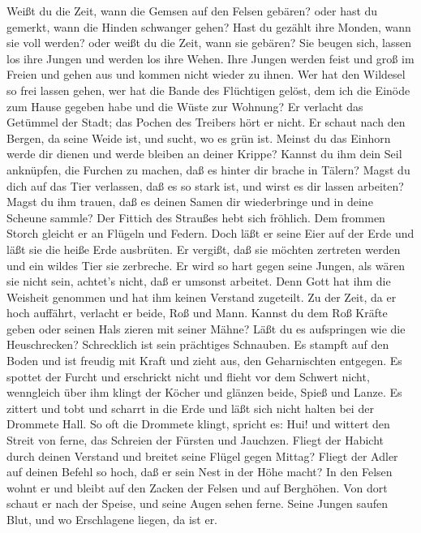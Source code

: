  Weißt du die Zeit, wann die Gemsen auf den Felsen gebären?
oder hast du gemerkt, wann die Hinden schwanger gehen?  Hast
du gezählt ihre Monden, wann sie voll werden? oder weißt du die Zeit,
wann sie gebären?  Sie beugen sich, lassen los ihre Jungen
und werden los ihre Wehen.  Ihre Jungen werden feist und
groß im Freien und gehen aus und kommen nicht wieder zu ihnen.
 Wer hat den Wildesel so frei lassen gehen, wer hat die
Bande des Flüchtigen gelöst,  dem ich die Einöde zum Hause
gegeben habe und die Wüste zur Wohnung?  Er verlacht das
Getümmel der Stadt; das Pochen des Treibers hört er nicht. 
Er schaut nach den Bergen, da seine Weide ist, und sucht, wo es grün
ist.  Meinst du das Einhorn werde dir dienen und werde
bleiben an deiner Krippe?  Kannst du ihm dein Seil
anknüpfen, die Furchen zu machen, daß es hinter dir brache in Tälern?
 Magst du dich auf das Tier verlassen, daß es so stark ist,
und wirst es dir lassen arbeiten?  Magst du ihm trauen, daß
es deinen Samen dir wiederbringe und in deine Scheune sammle?
 Der Fittich des Straußes hebt sich fröhlich. Dem frommen
Storch gleicht er an Flügeln und Federn.  Doch läßt er
seine Eier auf der Erde und läßt sie die heiße Erde ausbrüten.
 Er vergißt, daß sie möchten zertreten werden und ein
wildes Tier sie zerbreche.  Er wird so hart gegen seine
Jungen, als wären sie nicht sein, achtet's nicht, daß er umsonst
arbeitet.  Denn Gott hat ihm die Weisheit genommen und hat
ihm keinen Verstand zugeteilt.  Zu der Zeit, da er hoch
auffährt, verlacht er beide, Roß und Mann.  Kannst du dem
Roß Kräfte geben oder seinen Hals zieren mit seiner Mähne? 
Läßt du es aufspringen wie die Heuschrecken? Schrecklich ist sein
prächtiges Schnauben.  Es stampft auf den Boden und ist
freudig mit Kraft und zieht aus, den Geharnischten entgegen.
 Es spottet der Furcht und erschrickt nicht und flieht vor
dem Schwert nicht,  wenngleich über ihm klingt der Köcher
und glänzen beide, Spieß und Lanze.  Es zittert und tobt
und scharrt in die Erde und läßt sich nicht halten bei der Drommete
Hall.  So oft die Drommete klingt, spricht es: Hui! und
wittert den Streit von ferne, das Schreien der Fürsten und Jauchzen.
 Fliegt der Habicht durch deinen Verstand und breitet seine
Flügel gegen Mittag?  Fliegt der Adler auf deinen Befehl so
hoch, daß er sein Nest in der Höhe macht?  In den Felsen
wohnt er und bleibt auf den Zacken der Felsen und auf Berghöhen.
 Von dort schaut er nach der Speise, und seine Augen sehen
ferne.  Seine Jungen saufen Blut, und wo Erschlagene
liegen, da ist er.


